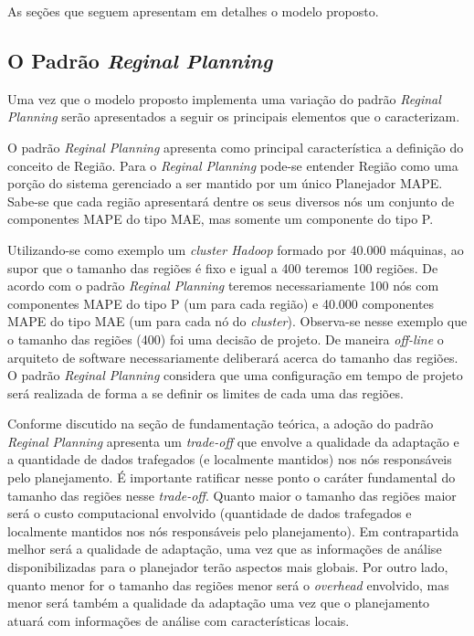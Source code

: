 \documentclass[conference]{IEEEtran}
\begin{document}
As seções que seguem apresentam em detalhes o modelo proposto.

\subsection{O Padrão \textit{Reginal Planning}}
Uma vez que o modelo proposto implementa uma variação do padrão \textit{Reginal Planning} serão apresentados a seguir os principais elementos que o caracterizam.

O padrão \textit{Reginal Planning} apresenta como principal característica a definição do conceito de Região. Para o \textit{Reginal Planning} pode-se entender Região como uma porção do sistema gerenciado a ser mantido por um único Planejador MAPE. Sabe-se que cada região apresentará dentre os seus diversos nós um conjunto de componentes MAPE do tipo MAE, mas somente um componente do tipo P.

Utilizando-se como exemplo um \textit{cluster Hadoop} formado por 40.000 máquinas, ao supor que o tamanho das regiões é fixo e igual a 400 teremos 100 regiões. De acordo com o padrão \textit{Reginal Planning} teremos necessariamente 100 nós com componentes MAPE do tipo P (um para cada região) e 40.000 componentes MAPE do tipo MAE (um para cada nó do \textit{cluster}). Observa-se nesse exemplo que o tamanho das regiões (400) foi uma decisão de projeto. De maneira \textit{off-line} o arquiteto de software necessariamente deliberará acerca do tamanho das regiões. O padrão \textit{Reginal Planning} considera que uma configuração em tempo de projeto será realizada de forma a se definir os limites de cada uma das regiões.

Conforme discutido na seção de fundamentação teórica, a adoção do padrão \textit{Reginal Planning} apresenta um \textit{trade-off} que envolve a qualidade da adaptação e a quantidade de dados trafegados (e localmente mantidos) nos nós responsáveis pelo planejamento. É importante ratificar nesse ponto o caráter fundamental do tamanho das regiões nesse \textit{trade-off}. Quanto maior o tamanho das regiões maior será o custo computacional envolvido (quantidade de dados trafegados e localmente mantidos nos nós responsáveis pelo planejamento). Em contrapartida melhor será a qualidade de adaptação, uma vez que as informações de análise disponibilizadas para o planejador terão aspectos mais globais. Por outro lado, quanto menor for o tamanho das regiões menor será o \textit{overhead} envolvido, mas menor será também a qualidade da adaptação uma vez que o planejamento atuará com informações de análise com características locais.
\end{document}
